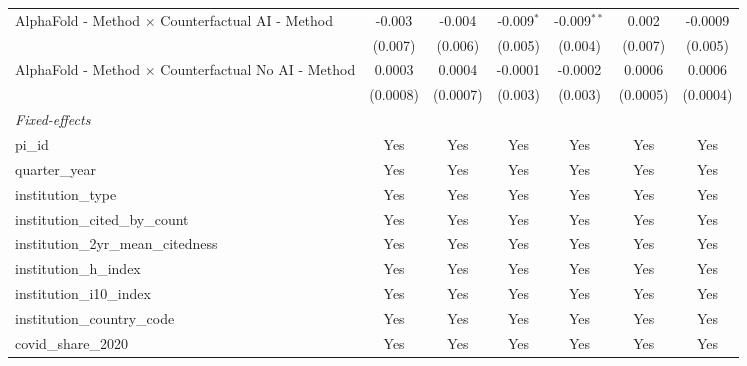 \begin{tabular}{lcccccc}
   AlphaFold - Method $\times$ Counterfactual AI - Method      & -0.003        & -0.004       & -0.009$^{*}$  & -0.009$^{**}$ & 0.002         & -0.0009\\   
                                                               & (0.007)       & (0.006)      & (0.005)       & (0.004)       & (0.007)       & (0.005)\\   
   AlphaFold - Method $\times$ Counterfactual No AI - Method   & 0.0003        & 0.0004       & -0.0001       & -0.0002       & 0.0006        & 0.0006\\   
                                                               & (0.0008)      & (0.0007)     & (0.003)       & (0.003)       & (0.0005)      & (0.0004)\\   
   \midrule
   \emph{Fixed-effects}\\
   pi\_id                                                      & Yes           & Yes          & Yes           & Yes           & Yes           & Yes\\  
   quarter\_year                                               & Yes           & Yes          & Yes           & Yes           & Yes           & Yes\\  
   institution\_type                                           & Yes           & Yes          & Yes           & Yes           & Yes           & Yes\\  
   institution\_cited\_by\_count                               & Yes           & Yes          & Yes           & Yes           & Yes           & Yes\\  
   institution\_2yr\_mean\_citedness                           & Yes           & Yes          & Yes           & Yes           & Yes           & Yes\\  
   institution\_h\_index                                       & Yes           & Yes          & Yes           & Yes           & Yes           & Yes\\  
   institution\_i10\_index                                     & Yes           & Yes          & Yes           & Yes           & Yes           & Yes\\  
   institution\_country\_code                                  & Yes           & Yes          & Yes           & Yes           & Yes           & Yes\\  
   covid\_share\_2020                                          & Yes           & Yes          & Yes           & Yes           & Yes           & Yes\\  
   \midrule

\end{tabular}

